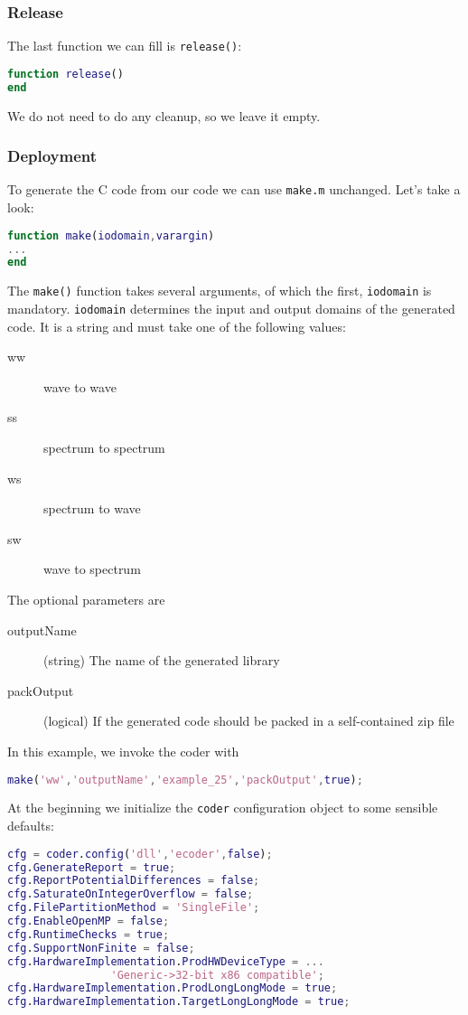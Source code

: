 \documentclass[11pt,a4paper,twoside]{article}
\newcommand{\+}{\discretionary{\mbox{\scriptsize$\hookleftarrow$}}{}{}}
\begin{document}
\subsubsection*{Release}
The last function we can fill is \texttt{release()}:
\begin{lstlisting}[language=Matlab]
function release()
end
\end{lstlisting}
We do not need to do any cleanup, so we leave it empty.
\subsubsection*{Deployment}
To generate the C code from our \Matlab{} code we can use \texttt{make.m}
unchanged. Let's take a look:
\begin{lstlisting}[language=Matlab]
function make(iodomain,varargin)
...
end
\end{lstlisting}
The \texttt{make()} function takes several arguments, of which the first,
\texttt{iodomain} is mandatory. \texttt{iodomain} determines the input and output
domains of the generated code. It is a string and must take one of the following
values:
\begin{description}
\item[ww] wave to wave 
\item[ss] spectrum to spectrum
\item[ws] spectrum to wave
\item[sw] wave to spectrum
\end{description}
The optional parameters are
\begin{description}
\item[outputName] (string) The name of the generated library
\item[packOutput] (logical) If the generated code should be packed in a
  self-contained zip file
\end{description}
In this example, we invoke the coder with
\begin{lstlisting}[language=Matlab]
make('ww','outputName','example_25','packOutput',true);
\end{lstlisting}
At the beginning we initialize the \texttt{coder} configuration object to some
sensible defaults:
\begin{lstlisting}[language=Matlab]
%% Create configuration object of class 'coder.CodeConfig'.
cfg = coder.config('dll','ecoder',false);
cfg.GenerateReport = true;
cfg.ReportPotentialDifferences = false;
cfg.SaturateOnIntegerOverflow = false;
cfg.FilePartitionMethod = 'SingleFile';
cfg.EnableOpenMP = false;
cfg.RuntimeChecks = true;
cfg.SupportNonFinite = false;
cfg.HardwareImplementation.ProdHWDeviceType = ...
                'Generic->32-bit x86 compatible';
cfg.HardwareImplementation.ProdLongLongMode = true;
cfg.HardwareImplementation.TargetLongLongMode = true;
\end{lstlisting}
\end{document}
